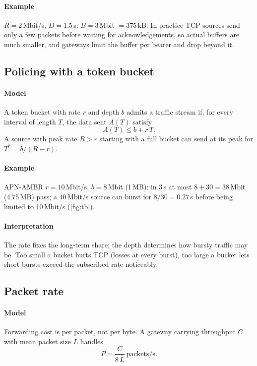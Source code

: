 \documentclass[11pt,a4paper]{article}
\begin{document}
\paragraph{Example} $R = 2$\,Mbit/s, $D = 1.5$\,s: $B = 3$\,Mbit $= 375$\,kB. In practice TCP sources send
only a few packets before waiting for acknowledgements, so actual buffers are much smaller, and gateways
limit the buffer per bearer and drop beyond it.

\subsection{Policing with a token bucket}\label{sec:tb}
\paragraph{Model} A token bucket with rate $r$ and depth $b$ admits a traffic stream if, for every interval
of length $T$, the data sent $A(T)$ satisfy
\begin{equation}\label{eq:tb}
  A(T) \le b + r\,T .
\end{equation}
A source with peak rate $R > r$ starting with a full bucket can send at its peak for $T^\ast = b/(R-r)$.
\paragraph{Example} APN-AMBR $r = 10$\,Mbit/s, $b = 8$\,Mbit (1\,MB): in 3\,s at most $8 + 30 = 38$\,Mbit
(4.75\,MB) pass; a 40\,Mbit/s source can burst for $8/30 = 0.27$\,s before being limited to 10\,Mbit/s
(\cref{fig:tb}).
\paragraph{Interpretation} The rate fixes the long-term share; the depth determines how bursty traffic may
be. Too small a bucket hurts TCP (losses at every burst), too large a bucket lets short bursts exceed the
subscribed rate noticeably.

\begin{acnfigure}
  \caption{Token-bucket envelope $b + rT$ (\cref{eq:tb}) and a peak-rate source.}
  \label{fig:tb}
\end{acnfigure}

\subsection{Packet rate}\label{sec:pps}
\paragraph{Model} Forwarding cost is per packet, not per byte. A gateway carrying throughput $C$ with mean
packet size $\bar L$ handles
\begin{equation}\label{eq:pps}
  P = \frac{C}{8\,\bar L}\ \text{packets/s}.
\end{equation}
\end{document}
